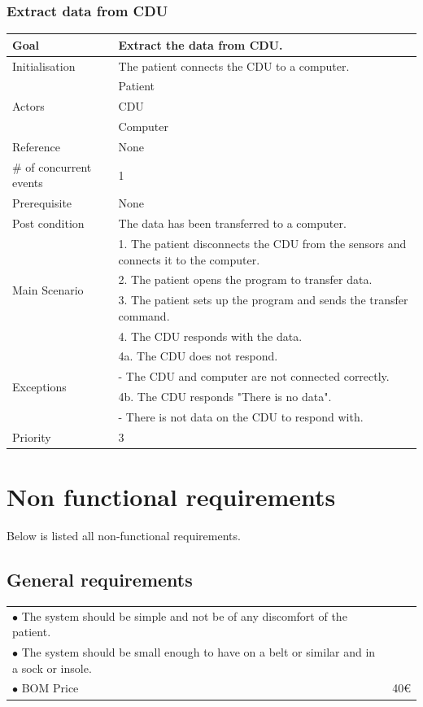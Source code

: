 \subsubsection{Extract data from CDU}
\begin{table}[H]
	\centering
	\begin{tabular}{|l|p{10cm}|}
	\hline
	Goal 							& Extract the data from CDU.\\ \hline
	Initialisation 					& The patient connects the CDU to a computer. \\ \hline
	\multirow{3}{*}{Actors} 		& Patient \\ 
									& CDU \\
									& Computer \\\hline
	Reference 						& None \\ \hline
	\# of concurrent events 		& 1 \\ \hline
	Prerequisite  					& None \\ \hline
	Post condition 					& The data has been transferred to a computer. \\ \hline
	\multirow{4}{*}{Main Scenario} 	& 1. The patient disconnects the CDU from the sensors and connects it to the computer. \\
									& 2. The patient opens the program to transfer data.\\
									& 3. The patient sets up the program and sends the transfer command.\\ 
									& 4. The CDU responds with the data. \\ \hline
	\multirow{4}{*}{Exceptions} & 4a. The CDU does not respond. \\ 
								& - The CDU and computer are not connected correctly.\\											& 4b. The CDU responds "There is no data". \\
								& - There is not data on the CDU to respond with.\\\hline
	Priority					& 3\\\hline
	\end{tabular}
\end{table}

\section{Non functional requirements}
Below is listed all non-functional requirements. \\

\subsection{General requirements}
\begin{table}[H]
\begin{tabular}{p{10cm} p{2cm}}
$\bullet$ The system should be simple and not be of any discomfort of the patient. & \\
$\bullet$ The system should be small enough to have on a belt or similar and in a sock or insole. &\\
$\bullet$ BOM Price & 40€\\
\end{tabular}
\end{table}


